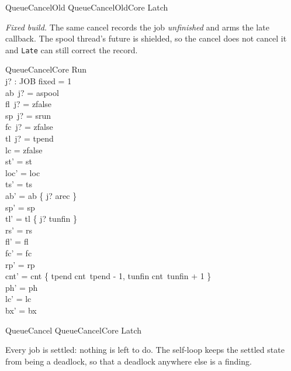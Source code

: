 \documentclass[a4paper,10pt,fleqn]{article}
\newcommand{\field}[1]{\texttt{#1}}
\begin{document}
\begin{zed}
QueueCancelOld  QueueCancelOldCore \land Latch
\end{zed}

\emph{Fixed build.} The same cancel records the job \emph{unfinished} and arms the
late callback. The spool thread's future is shielded, so the cancel does not
cancel it and \field{Late} can still correct the record.

\begin{schema}{QueueCancelCore}
\Delta Run \\ j? : JOB
\where
fixed = 1 \\
ab~j? = aspool \\
fl~j? = zfalse \\
sp~j? = srun \\
fc~j? = zfalse \\
tl~j? = tpend \\
lc = zfalse \\
st' = st \\
loc' = loc \\
ts' = ts \\
ab' = ab \oplus \{ j? \mapsto arec \} \\
sp' = sp \\
tl' = tl \oplus \{ j? \mapsto tunfin \} \\
rs' = rs \\
fl' = fl \\
fc' = fc \\
rp' = rp \\
cnt' = cnt \oplus \{ tpend \mapsto cnt~tpend - 1, tunfin \mapsto cnt~tunfin + 1 \} \\
ph' = ph \\
lc' = lc \\
bx' = bx
\end{schema}

\begin{zed}
QueueCancel  QueueCancelCore \land Latch
\end{zed}

Every job is settled: nothing is left to do. The self-loop keeps the settled
state from being a deadlock, so that a deadlock anywhere else is a finding.
\end{document}
